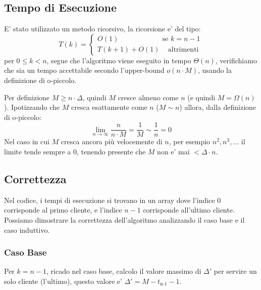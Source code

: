 \documentclass{article}
\begin{document}
    \subsection{ Tempo di Esecuzione }
        E' stato utilizzato un metodo ricorsivo, la ricorsione e' del tipo: 
        $$
        T(k) = \begin{cases} 
        O(1) \;\;\;\;\;\;\;\;\;\;\;\;\;\;\;\;\;\;\;\;\; \text{ se } k = n-1 \\
        T(k+1) + O(1) \;\;\; \text{ altrimenti }
        \end{cases}
        $$
        per $0\leq k< n$, segue che l'algoritmo viene eseguito in tempo $\Theta(n)$, verifichiamo che sia un tempo accettabile secondo l'upper-bound $o(n \cdot M)$, usando la definizione di o-piccolo.

        Per definizione $M\geq n \cdot\Delta$, quindi $M$ cresce almeno come $n$ (e quindi $M = \Omega(n)$).  
        Ipotizzando che $M$ cresca esattamente come $n$ ($M \sim n$) allora, dalla definizione di o-piccolo:
        $$
        \lim_{ n \to \infty } \frac{n}{n \cdot M} = \frac{1}{M} \sim \frac{1}{n} = 0
        $$
        Nel caso in cui $M$ cresca ancora più velocemente di $n$, per esempio $n^2, n^3, \dots$ il limite tende sempre a 0, tenendo presente che $M$ non e' mai $< \Delta \cdot n$.

    \subsection{ Correttezza }
        Nel codice, i tempi di esecuzione si trovano in un array dove l'indice $0$ corrisponde al primo cliente, e l'indice $n-1$ corrisponde all'ultimo cliente.
        Possiamo dimostrare la correttezza dell'algoritmo analizzando il caso base e il caso induttivo.
            \subsubsection{Caso Base}
            Per $k=n-1$, ricado nel caso base, calcolo il valore massimo di $\Delta'$ per servire un solo cliente (l'ultimo), questo valore e' $\Delta' = M - t_{\text{n-1}} - 1$. 
\end{document}
